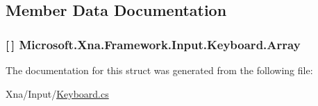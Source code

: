 \subsection{Member Data Documentation}
\hypertarget{struct_microsoft_1_1_xna_1_1_framework_1_1_input_1_1_keyboard_a0f8c73925d6515cf15f61cedd519067f}{}
\subsubsection[{Array}]{ \mbox{[}$\,$\mbox{]} Microsoft.\+Xna.\+Framework.\+Input.\+Keyboard.\+Array\hspace{0.3cm}{\ttfamily [static]}}\label{struct_microsoft_1_1_xna_1_1_framework_1_1_input_1_1_keyboard_a0f8c73925d6515cf15f61cedd519067f}


The documentation for this struct was generated from the following file\+:\begin{DoxyCompactItemize}
\item 
Xna/\+Input/\hyperlink{_keyboard_8cs}{Keyboard.\+cs}\end{DoxyCompactItemize}
